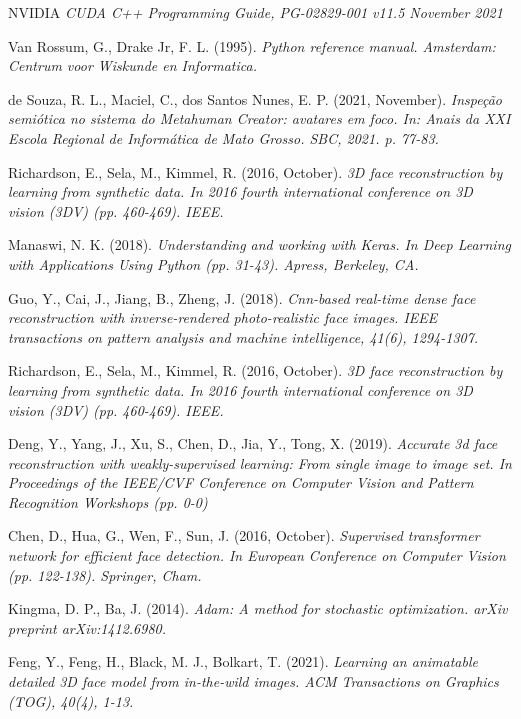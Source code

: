 \documentclass[12pt,a4]{article}
\begin{document}
\begin{thebibliography}{9}
	NVIDIA 
	\textit{CUDA C++ Programming Guide, PG-02829-001 v11.5 November 2021}
	
	Van Rossum, G., Drake Jr, F. L. (1995).
	\textit{Python reference manual. Amsterdam: Centrum voor Wiskunde en Informatica.}
	
	de Souza, R. L., Maciel, C., dos Santos Nunes, E. P. (2021, November).
	\textit{Inspeção semiótica no sistema do Metahuman Creator: avatares em foco. In: Anais da XXI Escola Regional de Informática de Mato Grosso. SBC, 2021. p. 77-83.}
	
	Richardson, E., Sela, M., Kimmel, R. (2016, October). 
	\textit{3D face reconstruction by learning from synthetic data. In 2016 fourth international conference on 3D vision (3DV) (pp. 460-469). IEEE.}
	
	Manaswi, N. K. (2018).
	\textit{Understanding and working with Keras. In Deep
		Learning with Applications Using Python (pp. 31-43). Apress, Berkeley,
		CA.}
	
	Guo, Y., Cai, J., Jiang, B., Zheng, J. (2018).
	\textit{Cnn-based real-time
		dense face reconstruction with inverse-rendered photo-realistic face images. IEEE transactions on pattern analysis and machine intelligence,
		41(6), 1294-1307.}
	
	 Richardson, E., Sela, M., Kimmel, R. (2016, October).
	\textit{3D face reconstruction by learning from synthetic data. In 2016 fourth international conference on 3D vision (3DV) (pp. 460-469). IEEE.}
	
	Deng, Y., Yang, J., Xu, S., Chen, D., Jia, Y., Tong, X. (2019).
	\textit{Accurate
		3d face reconstruction with weakly-supervised learning: From single image
		to image set. In Proceedings of the IEEE/CVF Conference on Computer
		Vision and Pattern Recognition Workshops (pp. 0-0)}
	
	Chen, D., Hua, G., Wen, F., Sun, J. (2016, October). 
	\textit{Supervised transformer network for efficient face detection. In European Conference on
		Computer Vision (pp. 122-138). Springer, Cham.}
	
	Kingma, D. P., Ba, J. (2014).
	\textit{Adam: A method for stochastic optimization. arXiv preprint arXiv:1412.6980.}
	
	Feng, Y., Feng, H., Black, M. J., Bolkart, T. (2021).
	\textit{Learning an animatable detailed 3D face model from in-the-wild images. ACM Transactions
		on Graphics (TOG), 40(4), 1-13.}
	

\end{thebibliography}
\end{document}
